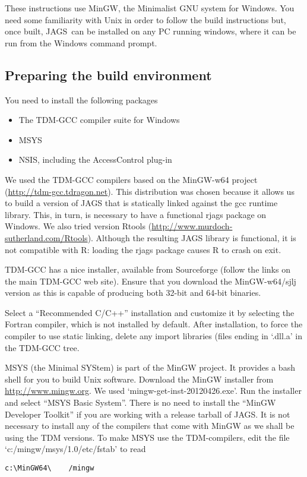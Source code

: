 \documentclass[11pt, a4paper, titlepage]{article}
\newcommand{\JAGS}{\textsf{JAGS}}
\newcommand{\file}[1]{{`\normalfont\textsf{#1}'}}
\begin{document}
These instructions use MinGW, the Minimalist GNU system for Windows.
You need some familiarity with Unix in order to follow the build
instructions but, once built, \JAGS\ can be installed on any PC
running windows, where it can be run from the Windows command prompt.

\subsection{Preparing the build environment}

You need to install the following packages
\begin{itemize}
\item The TDM-GCC compiler suite for Windows
\item MSYS  
\item NSIS, including the AccessControl plug-in  
\end{itemize}

We used the TDM-GCC compilers based on the MinGW-w64 project
(\url{http://tdm-gcc.tdragon.net}).  This distribution was chosen
because it allows us to build a version of JAGS that is statically
linked against the gcc runtime library.  This, in turn, is necessary
to have a functional rjags package on Windows.  We also tried version
Rtools (\url{http://www.murdoch-sutherland.com/Rtools}). Although the
resulting JAGS library is functional, it is not compatible with R:
loading the rjags package causes R to crash on exit.

TDM-GCC has a nice installer, available from Sourceforge (follow the
links on the main TDM-GCC web site). Ensure that you download the
MinGW-w64/sjlj version as this is capable of producing both 32-bit and
64-bit binaries.

Select a ``Recommended C/C++'' installation and customize it by
selecting the Fortran compiler, which is not installed by
default. After installation, to force the compiler to use static
linking, delete any import libraries (files ending in \file{.dll.a}
in the TDM-GCC tree.  

MSYS (the Minimal SYStem) is part of the MinGW project. It provides a
bash shell for you to build Unix software. Download the MinGW
installer from \url{http://www.mingw.org}. We used
\file{mingw-get-inst-20120426.exe}.  Run the installer and select
``MSYS Basic System''.  There is no need to install the ``MinGW
Developer Toolkit'' if you are working with a release tarball of
\JAGS.  It is not necessary to install any of the compilers that come
with MinGW as we shall be using the TDM versions. To make MSYS use the
TDM-compilers, edit the file \file{c:/mingw/msys/1.0/etc/fstab}
to read
\begin{verbatim}
c:\MinGW64\    /mingw
\end{verbatim}
\end{document}
